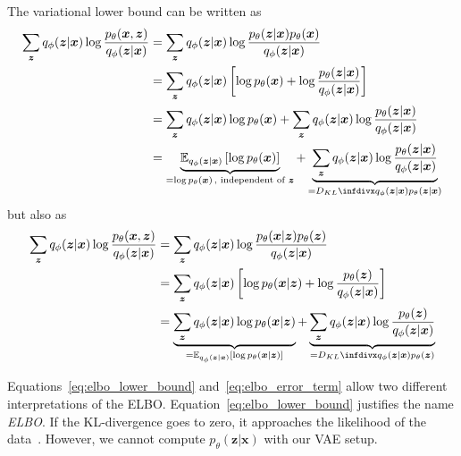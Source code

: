 The variational lower bound can be written as
\begin{align}
    \sum_{\bm{z}} q_\phi(\bm{z}|\bm{x}) \log \frac{p_\theta(\bm{x},\bm{z})}{q_\phi(\bm{z}|\bm{x})} &= \sum_{\bm{z}} q_\phi(\bm{z}|\bm{x}) \log \frac{p_\theta(\bm{z}|\bm{x})p_\theta(\bm{x})}{q_\phi(\bm{z}|\bm{x})}\\
    &= \sum_{\bm{z}} q_\phi(\bm{z}|\bm{x}) \left[ \log p_\theta(\bm{x}) + \log \frac{p_\theta(\bm{z}|\bm{x})}{q_\phi(\bm{z}|\bm{x})} \right]\\
    &= \sum_{\bm{z}} q_\phi(\bm{z}|\bm{x})\log p_\theta(\bm{x}) + \sum_{\bm{z}} q_\phi(\bm{z}|\bm{x})\log \frac{p_\theta(\bm{z}|\bm{x})}{q_\phi(\bm{z}|\bm{x})}\\
    &= \underbrace{\mathbb{E}_{q_\phi(\bm{z}|\bm{x})} \left[ \log p_\theta(\bm{x}) \right]}_{=\log p_\theta(\bm{x})\, \text{, independent of $\bm{z}$}} + \underbrace{\sum_{\bm{z}} q_\phi(\bm{z}|\bm{x})\log \frac{p_\theta(\bm{z}|\bm{x})}{q_\phi(\bm{z}|\bm{x})}}_{=\kldiv{q_\phi(\bm{z}|\bm{x})}{p_\theta(\bm{z}|\bm{x})}} \label{eq:elbo_lower_bound}
\end{align}
but also as
\begin{align}
    \sum_{\bm{z}} q_\phi(\bm{z}|\bm{x}) \log \frac{p_\theta(\bm{x},\bm{z})}{q_\phi(\bm{z}|\bm{x})} &= \sum_{\bm{z}} q_\phi(\bm{z}|\bm{x}) \log \frac{p_\theta(\bm{x}|\bm{z})p_\theta(\bm{z})}{q_\phi(\bm{z}|\bm{x})}\\
    &= \sum_{\bm{z}} q_\phi(\bm{z}|\bm{x}) \left[ \log p_\theta(\bm{x}|\bm{z}) + \log \frac{p_\theta(\bm{z})}{q_\phi(\bm{z}|\bm{x})} \right]\\
    &= \underbrace{\sum_{\bm{z}} q_\phi(\bm{z}|\bm{x})\log p_\theta(\bm{x}|\bm{z})}_{=\mathbb{E}_{q_\phi(\bm{z}|\bm{x})}\left[ \log p_\theta(\bm{x}|\bm{z}) \right]} + \underbrace{\sum_{\bm{z}} q_\phi(\bm{z}|\bm{x})\log \frac{p_\theta(\bm{z})}{q_\phi(\bm{z}|\bm{x})}}_{=\kldiv{q_\phi(\bm{z}|\bm{x})}{p_\theta(\bm{z})}} \label{eq:elbo_error_term}
\end{align}

Equations~\ref{eq:elbo_lower_bound} and~\ref{eq:elbo_error_term} allow two different interpretations of the \ac{ELBO}.
Equation~\ref{eq:elbo_lower_bound} justifies the name \textit{\acl{ELBO}}.
If the \ac{KL-divergence} goes to zero, it approaches the likelihood of the data~\citep[p. 18]{kingma2019introduction}.
However, we cannot compute $p_\theta(\bm{z}|\bm{x})$ with our \ac{VAE} setup.

